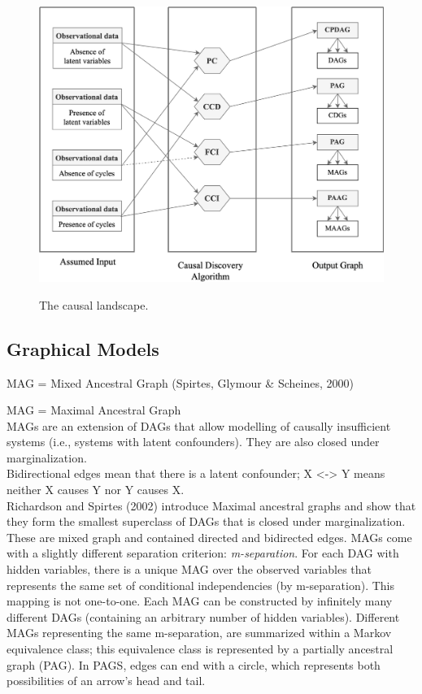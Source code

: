 \documentclass[11pt]{article}
\theoremstyle{definition}
\begin{document}
\begin{figure}[H]
    \centering
        \caption{The causal landscape.}
        \includegraphics[scale=.6]{figures/landscape.png}
    \label{fig:4}
\end{figure}


\subsection{Graphical Models}
MAG = Mixed Ancestral Graph (Spirtes, Glymour \& Scheines, 2000)

MAG = Maximal Ancestral Graph \\
MAGs are an extension of DAGs that allow modelling of causally insufficient systems (i.e., systems with latent confounders). They are also closed under marginalization.\\
Bidirectional edges mean that there is a latent confounder; X <-> Y means neither X causes Y nor Y causes X.\\

Richardson and Spirtes (2002) introduce Maximal ancestral graphs and show that they form the smallest superclass of DAGs that is closed under marginalization. These are mixed graph and contained directed and bidirected edges. MAGs come with a slightly different separation criterion: \textit{m-separation}. For each DAG with hidden variables, there is a unique MAG over the observed variables that represents the same set of conditional independencies (by m-separation). This mapping is not one-to-one. Each MAG can be constructed by infinitely many different DAGs (containing an arbitrary number of hidden variables). Different MAGs representing the same m-separation, are summarized within a Markov equivalence class; this equivalence class is represented by a partially ancestral graph (PAG). In PAGS, edges can end with a circle, which represents both possibilities of an arrow's head and tail.
\end{document}
